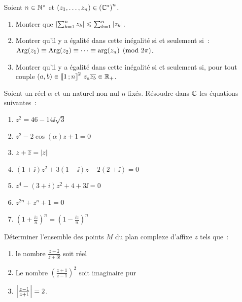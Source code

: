 \begin{exercice}
  Soient \(n \in{}\mathbb{N}^{*}\) et \((z_1, \ldots, z_n) \in{}{(\mathbb{C}^{*})}^n\).
  \begin{enumerate}
    \item Montrer que \( \left\lvert\sum_{k = 1}^n z_k\right\rvert \leqslant \sum_{k = 1}^n
      \left\lvert z_k\right\rvert\).
    \item Montrer qu'il y a égalité dans cette inégalité si et seulement
      si~: \(\operatorname{Arg}(z_1) \equiv \operatorname{Arg}(z_2) \equiv \cdots \equiv \arg(z_n)
      \pmod{2\pi}\).
    \item Montrer qu'il y a égalité dans cette inégalité si et seulement si,
      pour tout couple \((a,b) \in{}\mathopen{\llbracket}1\mathclose{}\mathpunct{};n\mathclose{\rrbracket}^2 \ z_a
      \overline{z_b} \in{}\mathbb{R}_{+}\).
  \end{enumerate}
\end{exercice}

\begin{exercice}
  Soient un réel \(\alpha\) et un naturel non nul \(n\) fixés. Résoudre dans
  \(\mathbb{C}\) les équations suivantes~:
  \begin{multicols}{2}
    \begin{enumerate}
      \item \(z^2 = 46-14\ii\sqrt{3}\)
      \item \(z^2-2\cos(\alpha)z + 1 = 0\)
      \item \(z + \overline{z} = \left\lvert z\right\rvert\)
      \item \((1 + \ii)z^2 + 3(1-\ii)z-2(2 + \ii) = 0\)
      \item \(z^4-(3 + i)z^2 + 4 + 3\ii{}= 0\)
      \item \(z^{2n} + z^n + 1 = 0\)
      \item \({\left(1+\frac{\ii{}z}{n}\right)}^n =
        {\left(1-\frac{\ii{}z}{n}\right)}^n\)
    \end{enumerate}
  \end{multicols}
\end{exercice}

\begin{exercice}
  Déterminer l'ensemble des points \(M\) du plan complexe d'affixe \(z\) tels
  que~:
  \begin{enumerate}
    \item le nombre \(\frac{z+2}{z+3\ii}\) soit réel
    \item Le nombre \({\left(\frac{z+1}{z-1}\right)}^2\) soit imaginaire
      pur
    \item \(\left\lvert\frac{z-1}{z + 1}\right\rvert = 2\).
  \end{enumerate}
\end{exercice}

